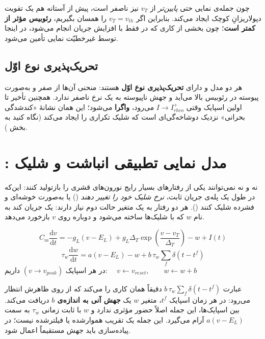 \documentclass[11pt,a4paper]{article}
\newcommand{\dd}{\mathrm{d}}
\begin{document}
\begin{keybox}
	چون جمله‌ی نمایی حتی \emph{پایین‌تر} از $v_T$ نیز ناصفر است، پیش از آستانه هم یک تقویت دپولاریزانِ کوچک ایجاد می‌کند. بنابراین اگر
	$v_T = v_{th}$
	را همسان بگیریم، \textbf{رئوبیس مؤثر  از  کمتر است}؛ چون بخشی از کاری که در  فقط با افزایش جریان انجام می‌شود، در اینجا توسط غیرخطیّت نمایی تأمین می‌شود.
\end{keybox}

\subsection{تحریک‌پذیری نوع اوّل}
هر دو مدل  و  دارای \textbf{تحریک‌پذیری نوع اوّل} هستند: منحنی  آن‌ها از صفر و به‌صورت پیوسته در رئوبیس بالا می‌آید و جهش ناپیوسته به یک نرخ ناصفر ندارد. همچنین تأخیر تا اولین اسپایک وقتی
$I \to I_{rheo}^+$
می‌رود، \textbf{واگرا} می‌شود؛ این همان نشانۀ «کندشدگی بحرانی» نزدیک دوشاخه‌گی‌ای است که شلیک تکراری را ایجاد می‌کند
(نگاه کنید به بخش ).

\section{: مدل نمایی تطبیقی انباشت و شلیک}
نه  و نه  نمی‌توانند یکی از رفتارهای بسیار رایج نورون‌های قشری را بازتولید کنند: این‌که در طول یک پله‌ی جریان ثابت، \emph{نرخ شلیک خود را تغییر دهند}
()
یا به‌صورت خوشه‌ای و فشرده شلیک کنند
().
هر دو رفتار به یک متغیر حالت دوم نیاز دارند: یک جریان کند به نام $w$ که با شلیک‌ها ساخته می‌شود و دوباره روی $v$ بازخورد می‌دهد.

\begin{eqbox}
	$$C_m \frac{\dd v}{\dd t} = -g_L(v - E_L) + g_L \Delta_T \exp\!\left(\frac{v - v_T}{\Delta_T}\right) - w + I(t)$$
	$$\tau_w \frac{\dd w}{\dd t} = a(v - E_L) - w + b\,\tau_w \sum_f \delta(t - t^f)$$
	در هر اسپایک
	$(v \to v_{peak})$
	داریم:
	$\quad v \leftarrow v_{reset}, \qquad w \leftarrow w + b$
\end{eqbox}

\begin{defbox}
	عبارت
	$b\,\tau_w\sum_f \delta(t-t^f)$
	دقیقاً همان کاری را می‌کند که از روی ظاهرش انتظار می‌رود: در هر زمان اسپایک $t^f$، متغیر $w$ یک \textbf{جهش آنی به اندازه‌ی $b$} دریافت می‌کند. بین اسپایک‌ها، این جمله اصلاً حضور مؤثری ندارد و $w$ با ثابت زمانی $\tau_w$ به سمت
	$a(v - E_L)$
	آرام می‌گیرد. این جمله یک تقریب هموارشده یا فیلترشده نیست؛ در پیاده‌سازی باید جهش مستقیماً اعمال شود.
\end{defbox}
\end{document}
